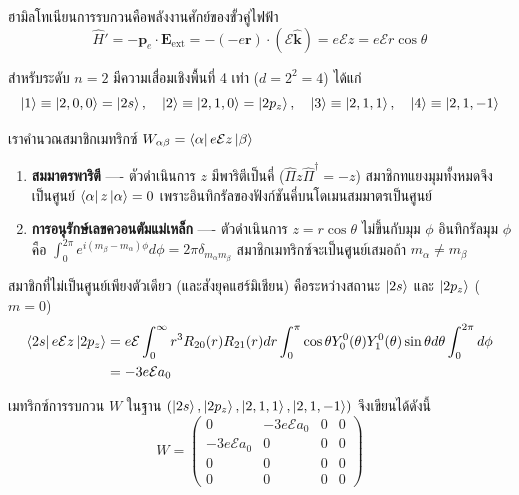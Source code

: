 ฮามิลโทเนียนการรบกวนคือพลังงานศักย์ของขั้วคู่ไฟฟ้า
\begin{equation}
\hat{H}' = -\mathbf{p}_e \cdot \mathbf{E}_{\text{ext}} = -(-e \mathbf{r})\cdot (\mathcal{E}\hat{\mathbf{k}}) = e\mathcal{E} z = e\mathcal{E} r\cos\theta
\label{eq:stark_hamiltonian}
\end{equation}

สำหรับระดับ $n = 2$ มีความเสื่อมเชิงพื้นที่ 4 เท่า ($d = 2^2 = 4$) ได้แก่
\begin{equation}
\ket{1} \equiv \ket{2, 0, 0} = \ket{2s}, \quad \ket{2} \equiv \ket{2, 1, 0} = \ket{2p_z}, \quad \ket{3} \equiv \ket{2, 1, 1}, \quad \ket{4} \equiv \ket{2, 1, -1}
\end{equation}

เราคำนวณสมาชิกเมทริกซ์ $W_{\alpha\beta} = \bra{\alpha} e\mathcal{E} z \ket{\beta}$
\begin{enumerate}
    \item \textbf{สมมาตรพาริตี} ---- ตัวดำเนินการ $z$ มีพาริตีเป็นคี่ ($\hat{\Pi} z \hat{\Pi}^\dagger = -z$) สมาชิกทแยงมุมทั้งหมดจึงเป็นศูนย์ $\bra{\alpha} z \ket{\alpha} = 0$ เพราะอินทิกรัลของฟังก์ชันคี่บนโดเมนสมมาตรเป็นศูนย์
    \item \textbf{การอนุรักษ์เลขควอนตัมแม่เหล็ก} ---- ตัวดำเนินการ $z = r\cos\theta$ ไม่ขึ้นกับมุม $\phi$ อินทิกรัลมุม $\phi$ คือ $\int_0^{2\pi} e^{i(m_\beta - m_\alpha)\phi} d\phi = 2\pi \delta_{m_\alpha m_\beta}$ สมาชิกเมทริกซ์จะเป็นศูนย์เสมอถ้า $m_\alpha \neq m_\beta$
\end{enumerate}

สมาชิกที่ไม่เป็นศูนย์เพียงตัวเดียว (และสังยุคแฮร์มิเชียน) คือระหว่างสถานะ $\ket{2s}$ และ $\ket{2p_z}$ ($m = 0$)
\begin{align}
\bra{2s} e\mathcal{E} z \ket{2p_z} &= e\mathcal{E} \int_0^\infty r^3 R_{20}(r) R_{21}(r) dr \int_0^\pi \cos\theta Y_0^0(\theta) Y_1^0(\theta) \sin\theta d\theta \int_0^{2\pi} d\phi \nonumber \\
&= -3 e \mathcal{E} a_0
\end{align}

เมทริกซ์การรบกวน $W$ ในฐาน $(\ket{2s}, \ket{2p_z}, \ket{2,1,1}, \ket{2,1,-1})$ จึงเขียนได้ดังนี้
\begin{equation}
W = \begin{pmatrix}
0 & -3e\mathcal{E}a_0 & 0 & 0 \\
-3e\mathcal{E}a_0 & 0 & 0 & 0 \\
0 & 0 & 0 & 0 \\
0 & 0 & 0 & 0
\end{pmatrix}
\end{equation}

